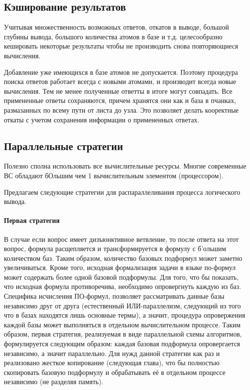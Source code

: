 \subsection{Кэширование результатов}
Учитывая множественность возможных ответов, откатов в выводе, большой глубины вывода, большого количества атомов в базе и т.д. целесообразно кешировать некоторые результаты чтобы не производить снова повторяющиеся вычисления.

Добавление уже имеющихся в базе атомов не допускается. Поэтому процедура поиска ответов работает всегда с новыми атомами, и производит всегда новые вычисления. Тем не менее полученные ответты в итоге могут совпадать. Все примененные ответы сохраняются, причем хранятся они как и база в пчанках, размазанных по всему пути от листа до узла. Это позволяет делать кооректные откаты с учетом сохранения информации о примененных ответах.

\subsection{Параллельные стратегии}
 
Полезно сполна использовать все вычислительные ресурсы. Многие современные ВС обладают бОльшим чем 1 вычислительным элементом (процессором).

Предлагаем следующие стратегии для распараллеливания процесса логического вывода.

\paragraph{Первая стратегия}

В случае если вопрос имеет дизъюнктивное ветвление, то после ответа на этот вопрос, формула расщепляется и трансформируется в формулу с б'ольшим количеством баз. Таким образом, количество базовых подформул может заметно увеличиваться. Кроме того, исходная формализация задачи в языке по-формул может содержать более одной базовой подформулы. Для того, что бы показать, что исходная формула противоречива, необходимо опровергнуть каждую из баз. Специфика исчисления ПО-формул, позволяет рассматривать данные базы независимо друг от друга (естественный ИЛИ-параллелизм, следующий из того что в базах находятся лишь основные термы), а значит, процедура опровержения каждой базы может выполняться в отдельном вычислительном процессе. Таким образом, первая стратегия, реализуемая в виде параллельной схемы алгоритмов, формулируется следующим образом: каждая базовая подформула опровергается независимо, а значит параллельно. Для нужд данной стратегии как раз и реализовано жесткое копирование (следующая глава), что бы полностью скопировать базовую подформулу и обрабатывать её в отдельном процессе независимо (не разделяя память).

